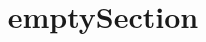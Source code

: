 \documentclass[a4paper,11pt,oneside,openany,report]{jsbook}
\title{emptySection}
\begin{document}
\maketitle

\section{}
\end{document}
